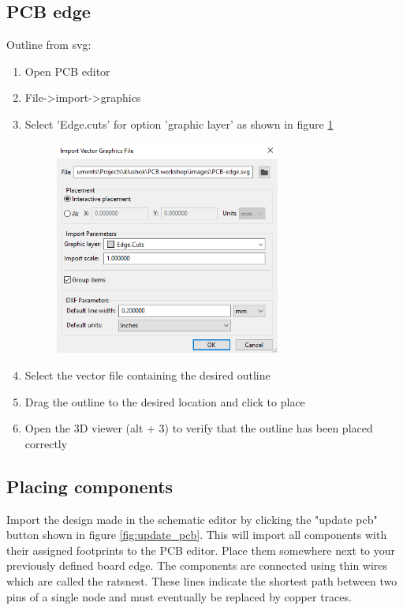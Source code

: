 \documentclass[12pt]{article}
\begin{document}



\subsection{PCB edge}
Outline from svg:
\begin{enumerate}
	\item Open PCB editor
	\item File->import->graphics
	\item Select 'Edge.cuts' for option 'graphic layer' as shown in figure \ref{fig:outline_import}
	      \begin{figure}[H]
		      \centering
		      \includegraphics[width=0.7\textwidth]{../images/graphic_outline_import.png}
		      \caption{}
		      \label{fig:outline_import}
	      \end{figure}
	\item Select the vector file containing the desired outline
	\item Drag the outline to the desired location and click to place
	\item Open the 3D viewer (alt + 3) to verify that the outline has been placed correctly
\end{enumerate}

\subsection{Placing components}
Import the design made in the schematic editor by clicking the "update pcb" button shown in figure \ref{fig:update_pcb}. This will import all components with their assigned footprints to the PCB editor. Place them somewhere next to your previously defined board edge. The components are connected using thin wires which are called the ratsnest. These lines indicate the shortest path between two pins of a single node and must eventually be replaced by copper traces.
\end{document}
